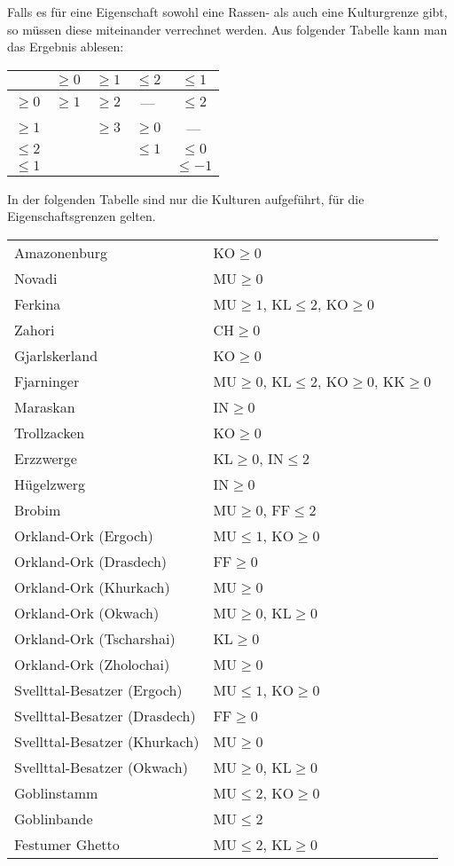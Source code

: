 Falls es für eine Eigenschaft sowohl eine Rassen- als auch eine Kulturgrenze gibt, so müssen diese miteinander verrechnet werden. Aus folgender Tabelle kann man das Ergebnis ablesen:

\begin{tabular}{c|cccc}
        & $\ge 0$ & $\ge 1$ & $\le 2$ & $\le 1$ \\\hline
$\ge 0$ & $\ge 1$ & $\ge 2$ & ---     & $\le 2$ \\
$\ge 1$ &         & $\ge 3$ & $\ge 0$ & ---     \\
$\le 2$ &         &         & $\le 1$ & $\le 0$ \\
$\le 1$ &         &         &         & $\le -1$ \\
\end{tabular}

In der folgenden Tabelle sind nur die Kulturen aufgeführt, für die Eigenschaftsgrenzen gelten.

\begin{tabular}{ll}
Amazonenburg & KO$\ge 0$ \\
Novadi & MU$\ge 0$ \\
Ferkina & MU$\ge 1$, KL$\le 2$, KO$\ge 0$ \\
Zahori & CH$\ge 0$ \\
Gjarlskerland & KO$\ge 0$ \\
Fjarninger & MU$\ge 0$, KL$\le 2$, KO$\ge 0$, KK$\ge 0$ \\
Maraskan & IN$\ge 0$ \\
Trollzacken & KO$\ge 0$ \\
Erzzwerge & KL$\ge 0$, IN$\le 2$ \\
Hügelzwerg & IN$\ge 0$ \\
Brobim & MU$\ge 0$, FF$\le 2$ \\
Orkland-Ork (Ergoch) & MU$\le 1$, KO$\ge 0$ \\
Orkland-Ork (Drasdech) & FF$\ge 0$ \\
Orkland-Ork (Khurkach) & MU$\ge 0$ \\
Orkland-Ork (Okwach) & MU$\ge 0$, KL$\ge 0$\\
Orkland-Ork (Tscharshai) & KL$\ge 0$\\
Orkland-Ork (Zholochai) & MU$\ge 0$\\
Svellttal-Besatzer (Ergoch) & MU$\le 1$, KO$\ge 0$\\
Svellttal-Besatzer (Drasdech) & FF$\ge 0$\\
Svellttal-Besatzer (Khurkach) & MU$\ge 0$\\
Svellttal-Besatzer (Okwach) & MU$\ge 0$, KL$\ge 0$\\
Goblinstamm & MU$\le 2$, KO$\ge 0$ \\
Goblinbande & MU$\le 2$ \\
Festumer Ghetto & MU$\le 2$, KL$\ge 0$ \\
\end{tabular}


